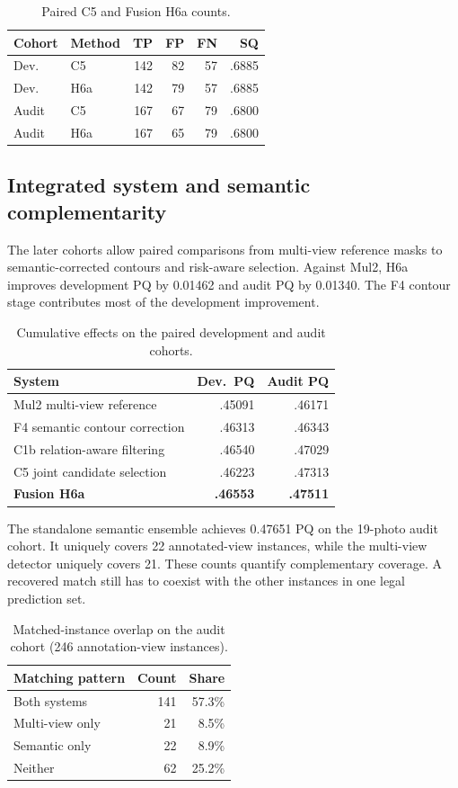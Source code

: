 \documentclass[sigconf]{acmart}
\begin{document}
\begin{table}[H]
\caption{Paired C5 and Fusion H6a counts.}
\centering
\begin{tabular}{@{}llrrrr@{}}
\toprule
Cohort & Method & TP & FP & FN & SQ\\
\midrule
Dev. & C5 & 142 & 82 & 57 & .6885\\
Dev. & H6a & 142 & 79 & 57 & .6885\\
Audit & C5 & 167 & 67 & 79 & .6800\\
Audit & H6a & 167 & 65 & 79 & .6800\\
\bottomrule
\end{tabular}
\end{table}

\newpage
\subsection{Integrated system and semantic complementarity}
The later cohorts allow paired comparisons from multi-view reference masks to semantic-corrected contours and risk-aware selection. Against Mul2, H6a improves development PQ by 0.01462 and audit PQ by 0.01340. The F4 contour stage contributes most of the development improvement.

\begin{table}[H]
\caption{Cumulative effects on the paired development and audit cohorts.}
\centering
\begin{tabular}{@{}lrr@{}}
\toprule
System & Dev.\ PQ & Audit PQ\\
\midrule
Mul2 multi-view reference & .45091 & .46171\\
F4 semantic contour correction & .46313 & .46343\\
C1b relation-aware filtering & .46540 & .47029\\
C5 joint candidate selection & .46223 & .47313\\
\textbf{Fusion H6a} & \textbf{.46553} & \textbf{.47511}\\
\bottomrule
\end{tabular}
\end{table}

The standalone semantic ensemble achieves 0.47651 PQ on the 19-photo audit cohort. It uniquely covers 22 annotated-view instances, while the multi-view detector uniquely covers 21. These counts quantify complementary coverage. A recovered match still has to coexist with the other instances in one legal prediction set.

\begin{table}[H]
\caption{Matched-instance overlap on the audit cohort (246 annotation-view instances).}
\centering
\begin{tabular}{@{}lrr@{}}
\toprule
Matching pattern & Count & Share\\
\midrule
Both systems & 141 & 57.3\%\\
Multi-view only & 21 & 8.5\%\\
Semantic only & 22 & 8.9\%\\
Neither & 62 & 25.2\%\\
\bottomrule
\end{tabular}
\end{table}
\end{document}

